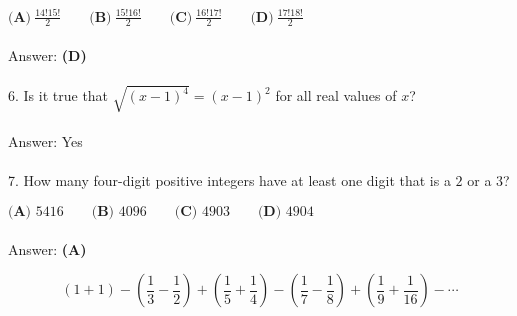 \documentclass{article}
\begin{document}
$\textbf{(A)}\ \frac{14!15!}{2}\qquad\textbf{(B)}\ \frac{15!16!}{2}\qquad\textbf{(C)}\ \frac{16!17!}{2}\qquad\textbf{(D)}\ \frac{17!18!}{2}$ \\\\
Answer: \textbf{(D)} \\\\

6. Is it true that $\sqrt{(x-1)^4}=(x-1)^2$ for all real values of $x$? \\\\
Answer: Yes \\\\

7. How many four-digit positive integers have at least one digit that is a $2$ or a $3$?

$\textbf{(A) } 5416\qquad\textbf{(B) } 4096\qquad\textbf{(C) } 4903\qquad\textbf{(D) } 4904$ \\\\
Answer: \textbf{(A) }





\par
\Large
\[(1+1)-\left(\frac{1}{3}-\frac{1}{2}\right)+\left(\frac{1}{5}+\frac{1}{4}\right)-\left(\frac{1}{7}-\frac{1}{8}\right)+
\left(\frac{1}{9}+\frac{1}{16}\right)-\cdots\]
\end{document}
